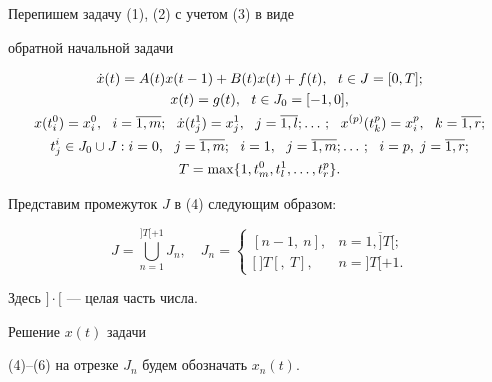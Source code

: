 Перепишем задачу (1), (2) с учетом (3) в виде


обратной начальной задачи


\begin{gather}


\Dot{x}(t)=A(t)x(t-1)+B(t)x(t)+f(t),\ \ t\in J=[0,T]; \\


%


x(t)=g(t),\ \ t\in J_0=[-1,0],\\


%


x(t_i^0)=x_i^0,\ \ i=\overline{1,m};\ \


\Dot{x}(t_j^1)=x_j^1,\ \ j=\overline{1,l}; \dotsc;\ \


x^{(p)}(t_k^p)=x_i^p,\ \ k=\overline{1,r};\\


%


t_j^i \in J_0 \cup J:i=0,\ \ j=\overline{1,m};\ \


i=1,\ \ j=\overline{1,m};\dotsc;\ \ i=p,\;j=\overline{1,r};\notag \\


%


T=\max\{1,t_m^0,t_l^1,\dotsc,t_r^p\}.


\end{gather}





Представим промежуток $J$ в (4) следующим образом:


\begin{equation}


J=\bigcup _{n=1}^{]T[+1}J_n,\quad J_n=


\begin{cases}


[n-1,\ n], & n=\overline{1,]T[};\\


\lbrack \ ] T[,\ T], & n=]T[+1.


\end{cases}


\end{equation}


Здесь $]\cdot[$ --- целая часть числа.





\begin{defn}


Решение $x(t)$ задачи


(4)--(6) на отрезке $J_n$ будем обозначать $x_n(t)$.


\end{defn}





